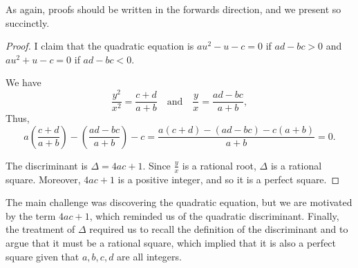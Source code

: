 \documentclass[../jarvis.tex]{subfiles}
\begin{document}
As again, proofs should be written in the forwards direction, and we present so succinctly.
\begin{proof}
I claim that the quadratic equation is $au^2-u-c=0$ if $ad-bc > 0$ and $au^2+u-c=0$ if $ad-bc < 0$.

We have $$\frac{y^2}{x^2}=\frac{c+d}{a+b} \quad\text{and}\quad \frac{y}{x}=\frac{ad-bc}{a+b},$$
Thus, $$a\left(\frac{c+d}{a+b}\right)-\left(\frac{ad-bc}{a+b}\right)-c=\frac{a(c+d)-(ad-bc)-c(a+b)}{a+b}=0.$$

The discriminant is $\Delta=4ac+1$. Since $\frac{y}{x}$ is a rational root, $\Delta$ is a rational square. Moreover, $4ac+1$ is a positive integer, and so it is a perfect square.
\end{proof}
\begin{moral}
The main challenge was discovering the quadratic equation, but we are motivated by the term $4ac+1$, which reminded us of the quadratic discriminant. Finally, the treatment of $\Delta$ required us to recall the definition of the discriminant and to argue that it must be a rational square, which implied that it is also a perfect square given that $a,b,c,d$ are all integers.
\end{moral}
\end{document}
